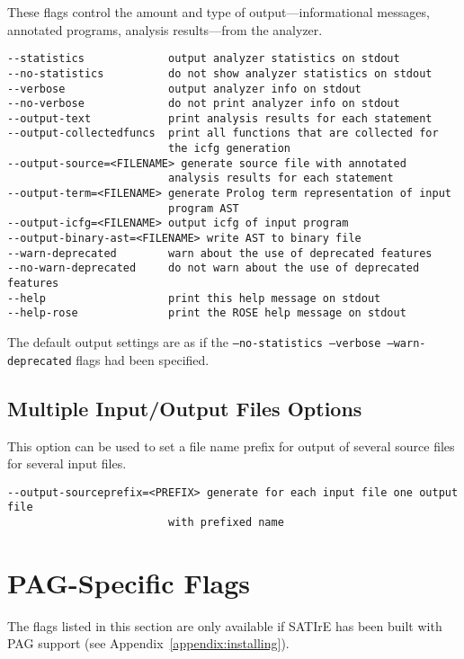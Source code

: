 \documentclass[a4paper,12pt]{report}
\begin{document}
These flags control the amount and type of output---informational messages,
annotated programs, analysis results---from the analyzer.

{\footnotesize
\begin{verbatim}
--statistics             output analyzer statistics on stdout
--no-statistics          do not show analyzer statistics on stdout
--verbose                output analyzer info on stdout
--no-verbose             do not print analyzer info on stdout
--output-text            print analysis results for each statement
--output-collectedfuncs  print all functions that are collected for
                         the icfg generation
--output-source=<FILENAME> generate source file with annotated 
                         analysis results for each statement
--output-term=<FILENAME> generate Prolog term representation of input
                         program AST
--output-icfg=<FILENAME> output icfg of input program
--output-binary-ast=<FILENAME> write AST to binary file
--warn-deprecated        warn about the use of deprecated features
--no-warn-deprecated     do not warn about the use of deprecated features
--help                   print this help message on stdout
--help-rose              print the ROSE help message on stdout
\end{verbatim}
}

The default output settings are as if the \texttt{--no-statistics
--verbose --warn-deprecated} flags had been specified.

\subsection{Multiple Input/Output Files Options}

This option can be used to set a file name prefix for output of several source
files for several input files.

{\footnotesize
\begin{verbatim}
--output-sourceprefix=<PREFIX> generate for each input file one output file
                         with prefixed name
\end{verbatim}
}

\section{PAG-Specific Flags}
\label{sec:pag_flags}

The flags listed in this section are only available if SATIrE has been built
with PAG support (see Appendix~\ref{appendix:installing}).
\end{document}

